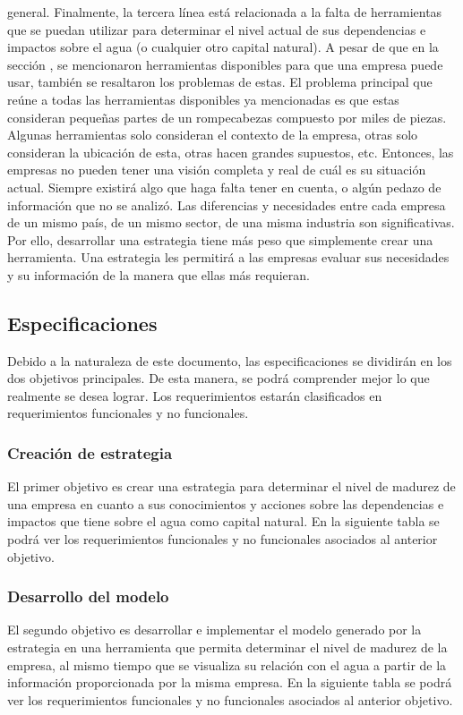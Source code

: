 general. Finalmente, la tercera línea está relacionada a la falta de herramientas que se puedan utilizar para determinar el nivel actual de sus dependencias e impactos sobre el agua (o cualquier otro capital natural). A pesar de que en la sección , se mencionaron herramientas disponibles para que una empresa puede usar, también se resaltaron los problemas de estas. El problema principal que reúne a todas las herramientas disponibles ya mencionadas es que estas consideran pequeñas partes de un rompecabezas compuesto por miles de piezas. Algunas herramientas solo consideran el contexto de la empresa, otras solo consideran la ubicación de esta, otras hacen grandes supuestos, etc. Entonces, las empresas no pueden tener una visión completa y real de cuál es su situación actual. Siempre existirá algo que haga falta tener en cuenta, o algún pedazo de información que no se analizó. Las diferencias y necesidades entre cada empresa de un mismo país, de un mismo sector, de una misma industria son significativas. Por ello, desarrollar una estrategia tiene más peso que simplemente crear una herramienta. Una estrategia les permitirá a las empresas evaluar sus necesidades y su información de la manera que ellas más requieran. 

\subsection{Especificaciones} \label{subsec:especificaciones}
Debido a la naturaleza de este documento, las especificaciones se dividirán en los dos objetivos principales. De esta manera, se podrá comprender mejor lo que realmente se desea lograr. Los requerimientos estarán clasificados en requerimientos funcionales y no funcionales.

\subsubsection{Creación de estrategia}
El primer objetivo es crear una estrategia para determinar el nivel de madurez de una empresa en cuanto a sus conocimientos y acciones sobre las dependencias e impactos que tiene sobre el agua como capital natural. En la siguiente tabla se podrá ver los requerimientos funcionales y no funcionales asociados al anterior objetivo.


\subsubsection{Desarrollo del modelo}
El segundo objetivo es desarrollar e implementar el modelo generado por la estrategia en una herramienta que permita determinar el nivel de madurez de la empresa, al mismo tiempo que se visualiza su relación con el agua a partir de la información proporcionada por la misma empresa. En la siguiente tabla se podrá ver los requerimientos funcionales y no funcionales asociados al anterior objetivo.


